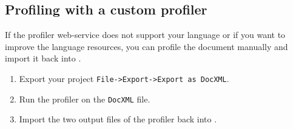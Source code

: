 \subsection{Profiling with a custom profiler}
\begin{frame}
		If the profiler web-service does not support your language or if you want to
		improve the language resources, you can profile the document manually and
		import it back into \pocoto{}.
	\begin{enumerate}
		\item Export your project \texttt{File->Export->Export as DocXML}.
		\item Run the profiler on the \texttt{DocXML} file.
		\item Import the two output files of the profiler back into \pocoto{}.
	\end{enumerate}
\end{frame}

\section{}
\subsection{}
\begin{frame}
\end{frame}



